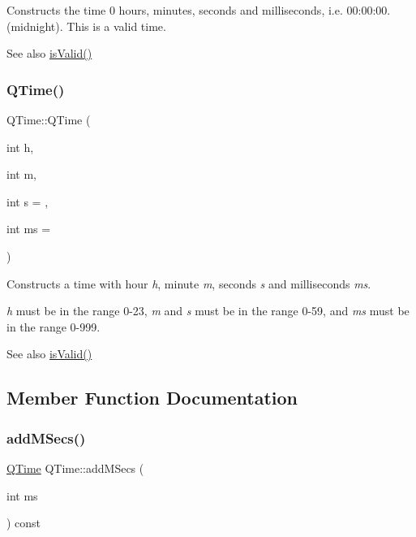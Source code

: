 Constructs the time 0 hours, minutes, seconds and milliseconds, i.\+e. 00\+:00\+:00. (midnight). This is a valid time.

\begin{DoxySeeAlso}{See also}
\mbox{\hyperlink{class_q_time_a4f54e1193a12519a7bd9efb7ea16fdca}{is\+Valid()}} 
\end{DoxySeeAlso}
\mbox{\label{class_q_time_a02d9df9fff2be1e261ae9a4b60742f5f}} 
\subsubsection{\texorpdfstring{QTime()}{QTime()}\hspace{0.1cm}{\footnotesize\ttfamily [2/2]}}
{\footnotesize\ttfamily Q\+Time\+::\+Q\+Time (\begin{DoxyParamCaption}\item[{int}]{h,  }\item[{int}]{m,  }\item[{int}]{s = {},  }\item[{int}]{ms = {} }\end{DoxyParamCaption})}

Constructs a time with hour {\itshape h}, minute {\itshape m}, seconds {\itshape s} and milliseconds {\itshape ms}.

{\itshape h} must be in the range 0-\/23, {\itshape m} and {\itshape s} must be in the range 0-\/59, and {\itshape ms} must be in the range 0-\/999.

\begin{DoxySeeAlso}{See also}
\mbox{\hyperlink{class_q_time_a4f54e1193a12519a7bd9efb7ea16fdca}{is\+Valid()}} 
\end{DoxySeeAlso}


\subsection{Member Function Documentation}
\mbox{\label{class_q_time_a1b43598c5d992242f13afe4e13a1e59f}} 
\subsubsection{\texorpdfstring{addMSecs()}{addMSecs()}}
{\footnotesize\ttfamily \mbox{\hyperlink{class_q_time}{Q\+Time}} Q\+Time\+::add\+M\+Secs (\begin{DoxyParamCaption}\item[{int}]{ms }\end{DoxyParamCaption}) const}

